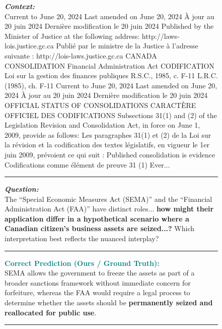 \begin{figure}[ht]
\begin{AcademicBox}
\small 
\setlength{\parindent}{0pt}

\textbf{\textit{Context:}} \\
Current to June 20, 2024
Last amended on June 20, 2024
À jour au 20 juin 2024
Dernière modification le 20 juin 2024
Published by the Minister of Justice at the following address:
http://laws-lois.justice.gc.ca
Publié par le ministre de la Justice à l’adresse suivante :
http://lois-laws.justice.gc.ca
CANADA
CONSOLIDATION
Financial Administration Act
CODIFICATION
Loi sur la gestion des finances
publiques
R.S.C., 1985, c. F-11
L.R.C. (1985), ch. F-11
Current to June 20, 2024
Last amended on June 20, 2024
À jour au 20 juin 2024
Dernière modification le 20 juin 2024
OFFICIAL STATUS
OF CONSOLIDATIONS
CARACTÈRE OFFICIEL
DES CODIFICATIONS
Subsections 31(1) and (2) of the Legislation Revision and
Consolidation Act, in force on June 1, 2009, provide as
follows:
Les paragraphes 31(1) et (2) de la Loi sur la révision et la
codification des textes législatifs, en vigueur le 1er juin
2009, prévoient ce qui suit :
Published consolidation is evidence
Codifications comme élément de preuve
31 (1) Ever...
\vspace{4pt} \hrule \vspace{4pt}

\textbf{\textit{Question:}} \\
The “Special Economic Measures Act (SEMA)” and the “Financial Administration Act (FAA)” have distinct roles... \textbf{how might their application differ in a hypothetical scenario where a Canadian citizen’s business assets are seized...?} Which interpretation best reflects the nuanced interplay?
\vspace{4pt} \hrule \vspace{4pt}

\textbf{\textcolor{teal}{Correct Prediction (Ours / Ground Truth):}} \hfill \textcolor{teal}{\checkmark} \\
SEMA allows the government to freeze the assets as part of a broader sanctions framework without immediate concern for forfeiture, whereas the FAA would require a legal process to determine whether the assets should be \textbf{permanently seized and reallocated for public use}.
\vspace{4pt} \hrule \vspace{4pt}


\end{AcademicBox}
\end{figure}

